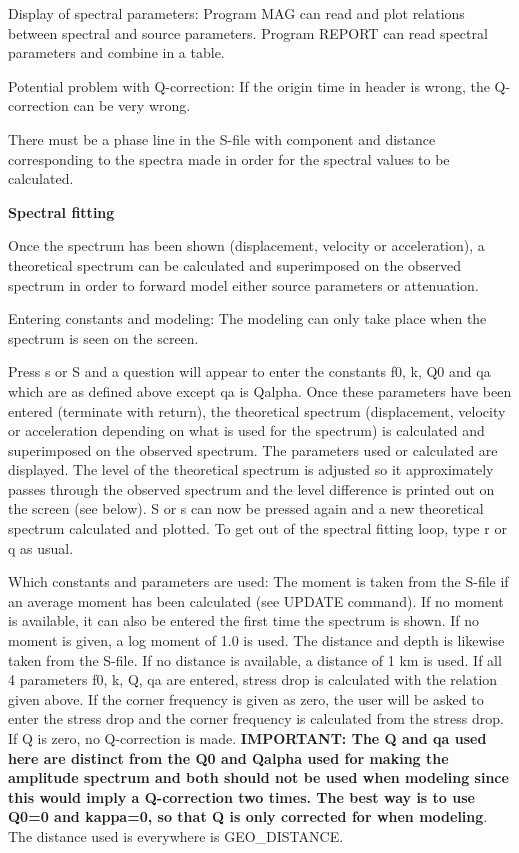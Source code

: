 Display of spectral parameters: Program MAG can read and plot relations between spectral and source parameters. Program REPORT can read spectral parameters and combine in a table. 

Potential problem with Q-correction: If the origin time in header is wrong, the Q-correction can be very wrong.  

There must be a phase line in the S-file with component and distance corresponding to the spectra made in order for the spectral values to be calculated. 

\textbf{Spectral fitting}

Once the spectrum has been shown (displacement, velocity or acceleration), a theoretical spectrum can be calculated and superimposed on the observed spectrum in order to forward model either source parameters or attenuation. 

Entering constants and modeling: The modeling can only take place when the spectrum is seen on the screen. 

Press s or S and a question will appear to enter the constants f0, k, Q0 and qa which are as defined above except qa is Qalpha. Once these parameters have been entered (terminate with return), the theoretical spectrum (displacement, velocity or acceleration depending on what is used for the spectrum) is calculated and superimposed on the observed spectrum. The parameters used or calculated are displayed. The level of the theoretical spectrum is adjusted so it approximately passes through the observed spectrum and the level difference is printed out on the screen (see below). S or s can now be pressed again and a new theoretical spectrum calculated and plotted. To get out of the spectral fitting loop, type r or q as usual. 

Which constants and parameters are used: The moment is taken from the S-file if an average moment has been calculated (see UPDATE command). If no moment is available, it can also be entered the first time the spectrum is shown. If no moment is given, a log moment of 1.0 is used. The distance and depth is likewise taken from the S-file. If no distance is available, a distance of 1 km is used. If all 4 parameters f0, k, Q, qa are entered, stress drop is calculated with the relation given above. If the corner frequency is given as zero, the user will be asked to enter the stress drop and the corner frequency is calculated from the stress drop. If Q is zero, no Q-correction is made. \textbf{IMPORTANT: The Q and qa used here are distinct from the Q0 and Qalpha used for making the amplitude spectrum and both should not be used when modeling since this would imply  a Q-correction two times. The best way is to use Q0=0 and kappa=0, so that Q is only corrected for when modeling}. The distance used is everywhere is GEO\_DISTANCE. 


